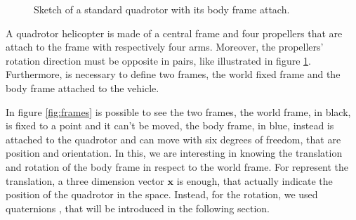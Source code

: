 \begin{figure}[h]
	\caption{Sketch of a standard quadrotor with its body frame attach.}
	\label{fig:quadrtotor}
\end{figure}

\noindent A quadrotor helicopter is made of a central frame and four propellers that are attach to the frame with respectively four arms. Moreover, the propellers' rotation direction must be opposite in pairs, like illustrated in figure \ref{fig:quadrtotor}. \newline
\noindent Furthermore, is necessary to define two frames, the world fixed frame and the body frame attached to the vehicle.

\noindent In figure \ref{fig:frames} is possible to see the two frames, the world frame, in black, is fixed to a point and it can't be moved, the body frame, in blue, instead is attached to the quadrotor and can move with six degrees of freedom, that are position and orientation. In this, we are interesting in knowing the translation and rotation of the body frame in respect to the world frame. For represent the translation, a three dimension vector $\mathbf{x}$ is enough, that actually indicate the position of the quadrotor in the space. Instead, for the rotation, we used quaternions \cite{quaternion}, that will be introduced in the following section.

